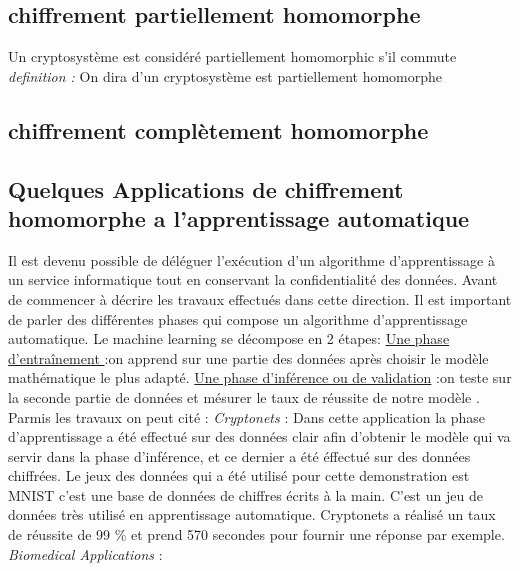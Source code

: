 \documentclass[a4paper,11pt]{report}
\begin{document}
\subsection{chiffrement partiellement homomorphe}
Un cryptosystème est considéré partiellement homomorphic s'il commute 
\textit{definition : } On dira d’un cryptosystème est partiellement homomorphe 
\subsection{chiffrement complètement homomorphe}
\subsection{Quelques Applications de chiffrement homomorphe a l'apprentissage automatique}
Il est devenu possible de déléguer l'exécution d'un algorithme d'apprentissage à un service informatique tout en conservant la confidentialité des données. \newline
Avant de commencer à décrire les travaux effectués dans cette direction. Il est important de parler des différentes phases qui compose un algorithme d'apprentissage automatique.\newline
Le machine learning se décompose en 2 étapes:\newline
\underline{Une phase d’entraînement }:\newline on apprend sur une partie des données après choisir le modèle mathématique le plus adapté.\newline 
\underline{Une phase d'inférence ou de validation} :\newline	 on teste sur la seconde partie de données et mésurer le taux de réussite de notre modèle .\newline
Parmis les travaux on peut cité :\newline
\textit{Cryptonets } :  \newline
Dans cette application la phase d'apprentissage a été effectué sur des données clair  afin d'obtenir le modèle qui va servir dans la phase d'inférence, et ce dernier a été éffectué sur des données chiffrées.\newline
Le jeux des données qui a été utilisé pour cette demonstration est MNIST c'est une base de données de chiffres écrits à la main. C'est un jeu de données très utilisé en apprentissage automatique.\newline
Cryptonets a réalisé un taux de réussite de 99 \% et prend 570 secondes pour fournir une réponse par exemple.\newline
\textit{Biomedical Applications } :
\newpage
\end{document}
